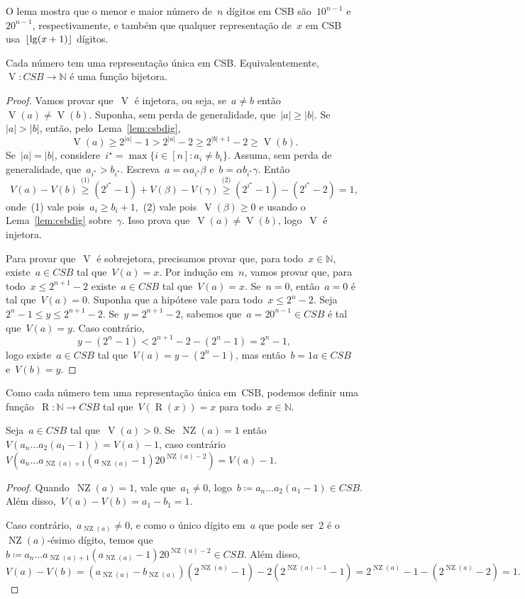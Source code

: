 \documentclass[main.tex]{subfiles}
\newcommand{\NZ}{\operatorname{NZ}}
\newcommand{\CSB}{\textit{CSB}}
\renewcommand{\V}{\operatorname{V}}
\newcommand{\R}{\operatorname{R}}
\begin{document}
O lema mostra que o menor e maior número de~$n$ dígitos em CSB são~$10^{n-1}$ e~$20^{n-1}$, respectivamente, e também que qualquer representação de~$x$ em CSB usa~$\lfloor\lg(x + 1)\rfloor$ dígitos.

\begin{theorem} \label{thm:csbbij}
	Cada número tem uma representação única em CSB. Equivalentemente,~${\V: \CSB \rightarrow \mathbb{N}}$ é uma função bijetora.
\end{theorem}
\begin{proof}
	Vamos provar que~$\V$ é injetora, ou seja, se~${a \neq b}$ então~${\V(a) \neq \V(b)}$. Suponha, sem perda de generalidade, que~$|a| \geq |b|$. Se~$|a| > |b|$, então, pelo~Lema~\ref{lem:csbdig},
	$$ \V(a) \geq 2^{|a|} - 1 > 2^{|a|} - 2 \geq 2^{|b| + 1} - 2 \geq \V(b). $$
	Se~$|a| = |b|$, considere~${i^\star = \max\{i \in [n] : a_i \neq b_i\}}$. Assuma, sem perda de generalidade, que~${a_{i^\star} > b_{i^\star}}$. Escreva~${a = \alpha a_{i^\star} \beta}$ e~${b = \alpha b_{i^\star} \gamma}$. Então
	$$ V(a) - V(b) \stackrel{\text{(1)}}{\geq} (2^{i^\star} - 1) + V(\beta) - V(\gamma) \stackrel{\text{(2)}}{\geq} (2^{i^\star} - 1) - (2^{i^\star} - 2) = 1, $$
	onde~(1) vale pois~$a_i \geq b_i + 1$,~(2) vale pois~$\V(\beta) \geq 0$ e usando o Lema~\ref{lem:csbdig} sobre~$\gamma$. Isso prova que~$\V(a) \neq \V(b)$, logo~$\V$ é injetora.

	Para provar que~$\V$ é sobrejetora, precisamos provar que, para todo~$x \in \mathbb{N}$, existe~$a \in \CSB$ tal que~$V(a) = x$. Por indução em~$n$, vamos provar que, para todo~$x \leq 2^{n+1} - 2$ existe~$a \in \CSB$ tal que~$V(a) = x$. Se~$n = 0$, então~$a = 0$ é tal que~$V(a) = 0$. Suponha que a hipótese vale para todo~$x \leq 2^n - 2$. Seja~${2^n - 1 \leq y \leq 2^{n+1} - 2}$. Se~$y = 2^{n+1} - 2$, sabemos que~${a = 20^{n-1} \in \CSB}$ é tal que~$V(a) = y$. Caso contrário,~
	$$y - (2^n - 1) < 2^{n+1} - 2 - (2^n - 1) = 2^n - 1,$$
	logo existe~$a \in \CSB$ tal que~${V(a) = y - (2^n - 1)}$, mas então~$b = 1a \in \CSB$ e~$V(b) = y$.
\end{proof}

Como cada número tem uma representação única em~CSB, podemos definir uma função~${\R: \mathbb{N} \rightarrow \CSB}$ tal que~$V(\R(x)) = x$ para todo~$x \in \mathbb{N}$.

\begin{lemma} \label{lem:csbsub}
	Seja~$a \in \CSB$ tal que~$\V(a) > 0$. Se~$\NZ(a) = 1$ então~$V(a_n \ldots a_2 (a_1-1)) = V(a) - 1$, caso contrário~${V(a_n \ldots a_{\NZ(a)+1} (a_{\NZ(a)} - 1) 2 0^{\NZ(a) - 2}) = V(a) - 1}$.
\end{lemma}
\begin{proof}
	Quando~$\NZ(a) = 1$, vale que~$a_1 \neq 0$, logo~${b \coloneqq a_n \ldots a_2 (a_1-1) \in \CSB}$. Além disso,~${V(a) - V(b) = a_1 - b_1 = 1}$.

	Caso contrário,~${a_{\NZ(a)} \neq 0}$, e como o único dígito em~$a$ que pode ser~2 é o~$\NZ(a)$-ésimo dígito, temos que~${b \coloneqq a_n \ldots a_{\NZ(a)+1} (a_{\NZ(a)} - 1) 2 0^{\NZ(a) - 2} \in \CSB}$. Além disso,
	$$ V(a) - V(b) = (a_{\NZ(a)} - b_{\NZ(a)}) (2^{\NZ(a)} - 1) - 2 (2^{\NZ(a) - 1} - 1) = 2^{\NZ(a)} - 1 - (2^{\NZ(a)} - 2) = 1. $$
\end{proof}
\end{document}
